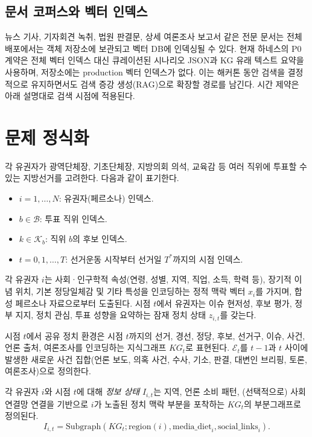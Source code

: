 \documentclass[11pt]{article}
\begin{document}
\subsection{문서 코퍼스와 벡터 인덱스}

뉴스 기사, 기자회견 녹취, 법원 판결문, 상세 여론조사 보고서 같은 전문 문서는 전체 배포에서는 객체 저장소에 보관되고 벡터 DB에 인덱싱될 수 있다. 현재 하네스의 P0 계약은 전체 벡터 인덱스 대신 큐레이션된 시나리오 JSON과 KG 유래 텍스트 요약을 사용하며, 저장소에는 production 벡터 인덱스가 없다. 이는 해커톤 동안 검색을 결정적으로 유지하면서도 검색 증강 생성(RAG)으로 확장할 경로를 남긴다. 시간 제약은 아래 설명대로 검색 시점에 적용된다.

\section{문제 정식화}

각 유권자가 광역단체장, 기초단체장, 지방의회 의석, 교육감 등 여러 직위에 투표할 수 있는 지방선거를 고려한다. 다음과 같이 표기한다.

\begin{itemize}
  \item $i = 1, \dots, N$: 유권자(페르소나) 인덱스.
  \item $b \in \mathcal{B}$: 투표 직위 인덱스.
  \item $k \in \mathcal{K}_b$: 직위 $b$의 후보 인덱스.
  \item $t = 0, 1, \dots, T$: 선거운동 시작부터 선거일 $T^*$까지의 시점 인덱스.
\end{itemize}

각 유권자 $i$는 사회·인구학적 속성(연령, 성별, 지역, 직업, 소득, 학력 등), 장기적 이념 위치, 기본 정당일체감 및 기타 특성을 인코딩하는 정적 맥락 벡터 $x_i$를 가지며, 합성 페르소나 자료으로부터 도출된다. 시점 $t$에서 유권자는 이슈 현저성, 후보 평가, 정부 지지, 정치 관심, 투표 성향을 요약하는 잠재 정치 상태 $z_{i,t}$를 갖는다.

시점 $t$에서 공유 정치 환경은 시점 $t$까지의 선거, 경선, 정당, 후보, 선거구, 이슈, 사건, 언론 출처, 여론조사를 인코딩하는 지식그래프 $KG_t$로 표현된다. $\mathcal{E}_t$를 $t-1$과 $t$ 사이에 발생한 새로운 사건 집합(언론 보도, 의혹 사건, 수사, 기소, 판결, 대변인 브리핑, 토론, 여론조사)으로 정의한다.

각 유권자 $i$와 시점 $t$에 대해 \emph{정보 상태} $I_{i,t}$는 지역, 언론 소비 패턴, (선택적으로) 사회 연결망 연결을 기반으로 $i$가 노출된 정치 맥락 부분을 포착하는 $KG_t$의 부분그래프로 정의된다.
\begin{equation}
I_{i,t} = \text{Subgraph}(KG_t; \text{region}(i), \text{media\_diet}_i, \text{social\_links}_i).
\end{equation}
\end{document}
